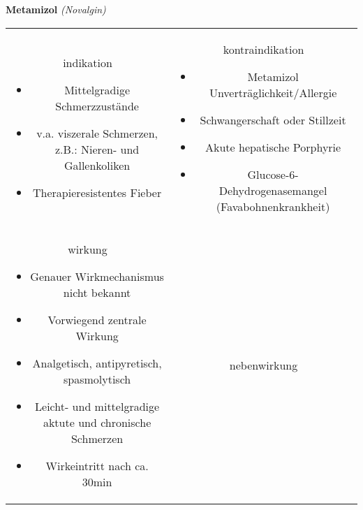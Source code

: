 \begin{frame}{
    \textbf{Metamizol}
    \textit{(Novalgin)}
}
    \begin{tabular}{c c}
        \begin{beamercolorbox}[wd=\boxwidth\textwidth,ht=\boxheight\textheight,sep=1em]{indikation}
            \begin{itemize}
                \item Mittelgradige Schmerzzustände
                \item v.a. viszerale Schmerzen, z.B.: Nieren- und Gallenkoliken	
                \item Therapieresistentes Fieber
            \end{itemize}
        \end{beamercolorbox} & 
        \begin{beamercolorbox}[wd=\boxwidth\textwidth,ht=\boxheight\textheight,sep=1em]{kontraindikation}
            \scriptsize
            \begin{itemize}
                \item Metamizol Unverträglichkeit/Allergie
                \item Schwangerschaft oder Stillzeit
                \item Akute hepatische Porphyrie
                \item Glucose-6-Dehydrogenasemangel (Favabohnenkrankheit)
            \end{itemize}
        \end{beamercolorbox} \\
        \begin{beamercolorbox}[wd=\boxwidth\textwidth,ht=\boxheight\textheight,sep=1em]{wirkung}
            \scriptsize
            \begin{itemize}
                \item Genauer Wirkmechanismus nicht bekannt
                \item Vorwiegend zentrale Wirkung
                \item Analgetisch, antipyretisch, spasmolytisch
                \item Leicht- und mittelgradige aktute und chronische Schmerzen
                \item Wirkeintritt nach ca. 30min
            \end{itemize}
        \end{beamercolorbox} & 
        \begin{beamercolorbox}[wd=\boxwidth\textwidth,ht=\boxheight\textheight,sep=1em]{nebenwirkung}

\end{beamercolorbox}
\end{tabular}
\end{frame}
